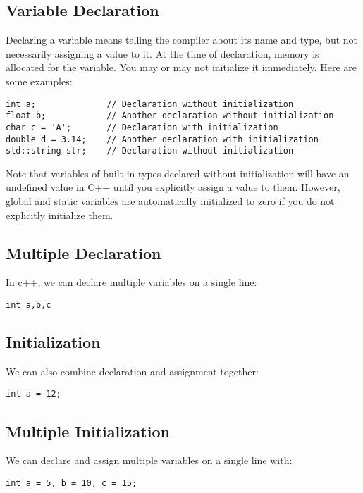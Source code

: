 \documentclass{report}
\begin{document}
    \subsection{Variable Declaration}
    \bigbreak \noindent 
    Declaring a variable means telling the compiler about its name and type, but not necessarily assigning a value to it. At the time of declaration, memory is allocated for the variable. You may or may not initialize it immediately. Here are some examples:
    \bigbreak \noindent 
    \sepline
    \begin{verbatim}
int a;              // Declaration without initialization
float b;            // Another declaration without initialization
char c = 'A';       // Declaration with initialization
double d = 3.14;    // Another declaration with initialization
std::string str;    // Declaration without initialization
    \end{verbatim}
    \sepline
    \bigbreak \noindent 
    Note that variables of built-in types declared without initialization will have an undefined value in C++ until you explicitly assign a value to them. However, global and static variables are automatically initialized to zero if you do not explicitly initialize them.

    \bigbreak \noindent 
    \subsection{Multiple Declaration}
    \bigbreak \noindent 
    In c++, we can declare multiple variables on a single line:
    \bigbreak \noindent 
    \sepline
    \begin{verbatim}
int a,b,c
    \end{verbatim}
    \sepline

    \bigbreak \noindent 
    \subsection{Initialization}
    \bigbreak \noindent 
    We can also combine declaration and assignment together:
    \bigbreak \noindent 
    \sepline
    \begin{verbatim}
int a = 12;
    \end{verbatim}
    \sepline

    \bigbreak \noindent 
    \subsection{Multiple Initialization}
    \bigbreak \noindent 
    We can declare and assign multiple variables on a single line with:
    \bigbreak \noindent 
    \sepline
    \begin{verbatim}
int a = 5, b = 10, c = 15;
    \end{verbatim}
    \sepline
\end{document}
